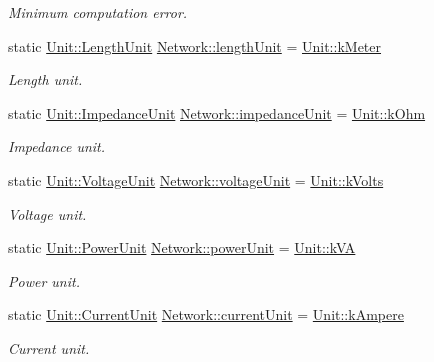 \begin{DoxyCompactItemize}
\begin{DoxyCompactList}\small\item\em Minimum computation error. \end{DoxyCompactList}\item 
static \hyperlink{class_unit_a8c8921f7b225ad6063b1cb573425b9a0}{Unit\+::\+Length\+Unit} \hyperlink{group___models_gae46c0e2bf39b343875e3c69066fe2652}{Network\+::length\+Unit} = \hyperlink{class_unit_a8c8921f7b225ad6063b1cb573425b9a0abfa41ebe7ee649a1f02c9b8ae570434b}{Unit\+::k\+Meter}
\begin{DoxyCompactList}\small\item\em Length unit. \end{DoxyCompactList}\item 
static \hyperlink{class_unit_a3747e779c805df24a71961290be3fbdf}{Unit\+::\+Impedance\+Unit} \hyperlink{group___models_ga5f3d72699a723c64a89d22e34df708ff}{Network\+::impedance\+Unit} = \hyperlink{class_unit_a3747e779c805df24a71961290be3fbdfa6b9c74d1763eefbaf751eeecff0bd9da}{Unit\+::k\+Ohm}
\begin{DoxyCompactList}\small\item\em Impedance unit. \end{DoxyCompactList}\item 
static \hyperlink{class_unit_a55b07dfa9457e1eca2c7194fe0cfc3c1}{Unit\+::\+Voltage\+Unit} \hyperlink{group___models_gacde031ef95f5c05565ee35769f2ed89e}{Network\+::voltage\+Unit} = \hyperlink{class_unit_a55b07dfa9457e1eca2c7194fe0cfc3c1aa54b2473993a702a3923525765bd6e4c}{Unit\+::k\+Volts}
\begin{DoxyCompactList}\small\item\em Voltage unit. \end{DoxyCompactList}\item 
static \hyperlink{class_unit_ace265ae255370ccacfd5370337572c3b}{Unit\+::\+Power\+Unit} \hyperlink{group___models_ga9504015bc566f4a3d3b4d4a86000293b}{Network\+::power\+Unit} = \hyperlink{class_unit_ace265ae255370ccacfd5370337572c3ba72b181a842ae2759488a2fa1410d3696}{Unit\+::k\+V\+A}
\begin{DoxyCompactList}\small\item\em Power unit. \end{DoxyCompactList}\item 
static \hyperlink{class_unit_a0794cf6c9682f48296dd4a5315389787}{Unit\+::\+Current\+Unit} \hyperlink{group___models_gac6a26db5fef2b1dd2a00faf6340d1702}{Network\+::current\+Unit} = \hyperlink{class_unit_a0794cf6c9682f48296dd4a5315389787a368a3c470f0b590a6100dda717a7dd4f}{Unit\+::k\+Ampere}
\begin{DoxyCompactList}\small\item\em Current unit. \end{DoxyCompactList}\end{DoxyCompactItemize}


